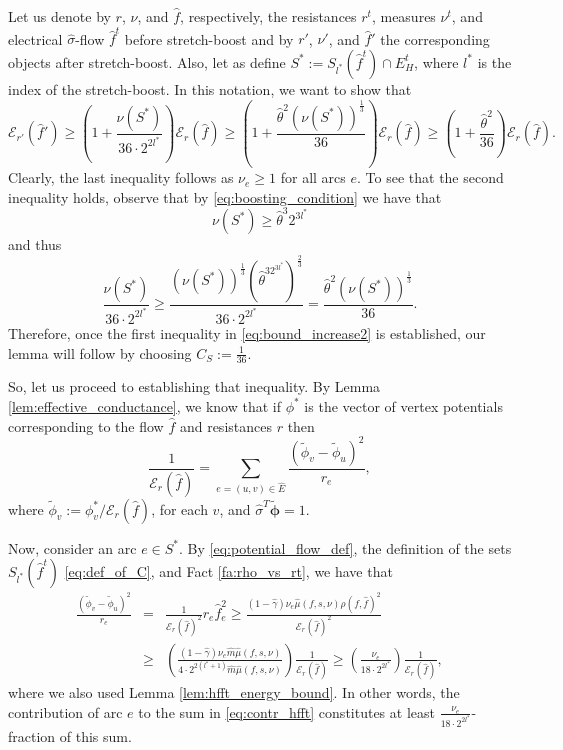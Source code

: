 \documentclass[11pt, letterpaper]{article}
\newcommand{\cincrease}{C_{S}}
\newcommand{\hE}{\widehat{E}}
\newcommand{\hm}{\widehat{m}}
\newcommand{\energy}[2]{\mathcal{E}_{#1}(#2)}
\newcommand{\Cset}[2]{S_{#1}(#2)}
\newcommand{\hf}{\hat{f}}
\newcommand{\hmu}{\hat{\mu}}
\newcommand{\hgamma}{\hat{\gamma}}
\newcommand{\htheta}{\hat{\theta}}
\newcommand{\vphi}{\boldsymbol{\mathit{\phi}}}
\newcommand{\vnu}{\boldsymbol{\mathit{\nu}}}
\newcommand{\hvsigma}{\boldsymbol{\mathit{\hat{\sigma}}}}
\newcommand{\tphi}{\widetilde{\phi}}
\newcommand{\tvphi}{\boldsymbol{\tilde{\phi}}}
\newcommand{\ff}{\boldsymbol{\mathit{f}}}
\newcommand{\hff}{\boldsymbol{\mathit{\hat{f}}}}
\newcommand{\rr}{\boldsymbol{\mathit{r}}}
\renewcommand{\ss}{\boldsymbol{\mathit{s}}}
\begin{document}
Let us denote by $\rr$, $\vnu$, and $\hff$, respectively, the resistances $\rr^t$, measures $\vnu^t$, and electrical $\hvsigma$-flow $\hff^t$ before stretch-boost and by $\rr'$, $\vnu'$, and $\hff'$ the corresponding objects after stretch-boost. Also, let as define $S^*:=\Cset{l^*}{\hff^t}\cap E_{H}^t$, where $l^*$ is the index of the stretch-boost. In this notation, we want to show that  
\begin{equation}
\label{eq:bound_increase2}
\energy{\rr'}{\hff'}\geq \left(1+\frac{\vnu(S^*)}{36\cdot 2^{2l^*}}\right) \energy{\rr}{\hff} \geq \left(1+\frac{\htheta^2(\vnu(S^*))^{\frac{1}{3}}}{36}\right) \energy{\rr}{\hff} \geq \left(1+\frac{\htheta^2}{36}\right) \energy{\rr}{\hff}.
\end{equation}
Clearly, the last inequality follows as $\nu_e\geq 1$ for all arcs $e$. To see that the second inequality holds, observe that by \eqref{eq:boosting_condition} we have that
\[
\vnu(S^*)\geq \htheta^3 2^{3l^*}
\]
and thus
\[
\frac{\vnu(S^*)}{36\cdot 2^{2l^*}} \geq \frac{(\vnu(S^*))^{\frac{1}{3}}(\htheta^32^{3l^*})^{\frac{2}{3}}}{36\cdot 2^{2l^*}} = \frac{\htheta^2(\vnu(S^*))^{\frac{1}{3}}}{36}.
\]
 Therefore, once the first inequality in \eqref{eq:bound_increase2} is established, our lemma will follow by choosing $\cincrease:=\frac{1}{36}$.


So, let us proceed to establishing that inequality. By Lemma \ref{lem:effective_conductance}, we know that if $\vphi^*$ is the vector of vertex potentials corresponding to the flow $\hff$ and resistances $\rr$ then 
\begin{equation}
\label{eq:contr_hfft}
\frac{1}{\energy{\rr}{\hff}} = \sum_{e=(u,v)\in \hE} \frac{(\tphi_v-\tphi_u)^2}{r_e},
\end{equation}
where $\tphi_v:=\phi_v^*/\energy{\rr}{\hff}$, for each $v$, and $\hvsigma^T\tvphi=1$. 

Now, consider an arc $e\in S^*$. By \eqref{eq:potential_flow_def}, the definition of the sets $\Cset{l^*}{\hff^t}$ \eqref{eq:def_of_C}, and Fact \ref{fa:rho_vs_rt}, we have that
\begin{eqnarray*}
\frac{(\tphi_v-\tphi_u)^2}{r_e} &=& \frac{1}{\energy{\rr}{\hff}^2} r_e \hf^{2}_e \geq \frac{(1-\hgamma)\nu_e \hmu(\ff,\ss,\vnu) \rho(\ff,\hff)^2}{\energy{\rr}{\hff}^2}\\
&\geq & \left( \frac{(1-\hgamma)\nu_e \hm \hmu(\ff,\ss,\vnu)}{4\cdot 2^{2(l^*+1)} \hm \hmu(\ff,\ss,\vnu)}\right)\frac{1}{\energy{\rr}{\hff}}\geq \left( \frac{\nu_e}{18\cdot 2^{2l^*}}\right)\frac{1}{\energy{\rr}{\hff}},
\end{eqnarray*}
where we also used Lemma \ref{lem:hfft_energy_bound}. In other words, the contribution of arc $e$ to the sum in \eqref{eq:contr_hfft} constitutes at least $\frac{\nu_e}{18\cdot 2^{2l^*}}$-fraction of this sum.
\end{document}
